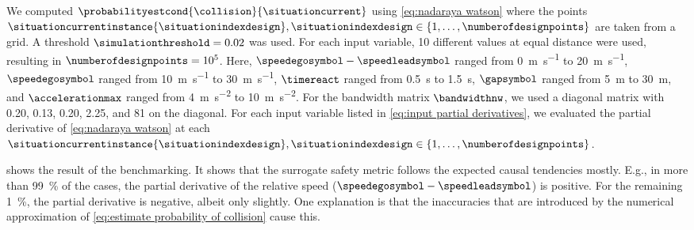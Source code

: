 We computed $\probabilityestcond{\collision}{\situationcurrent}$ using \cref{eq:nadaraya watson} where the points $\situationcurrentinstance{\situationindexdesign}, \situationindexdesign\in\{1,\ldots,\numberofdesignpoints\}$ are taken from a grid.
A threshold $\simulationthreshold=0.02$ was used.
For each input variable, 10 different values at equal distance were used, resulting in $\numberofdesignpoints=10^5$.
Here, $\speedegosymbol-\speedleadsymbol$ ranged from \SI{0}{\meter\per\second} to \SI{20}{\meter\per\second}, $\speedegosymbol$ ranged from \SI{10}{\meter\per\second} to \SI{30}{\meter\per\second}, $\timereact$ ranged from \SI{0.5}{\second} to \SI{1.5}{\second}, $\gapsymbol$ ranged from \SI{5}{\meter} to \SI{30}{\meter}, and $\accelerationmax$ ranged from \SI{4}{\meter\per\second\squared} to \SI{10}{\meter\per\second\squared}.
For the bandwidth matrix $\bandwidthnw$, we used a diagonal matrix with 0.20, 0.13, 0.20, 2.25, and 81 on the diagonal.
For each input variable listed in \cref{eq:input partial derivatives}, we evaluated the partial derivative of \cref{eq:nadaraya watson} at each $\situationcurrentinstance{\situationindexdesign}, \situationindexdesign\in\{1,\ldots,\numberofdesignpoints\}$.

 shows the result of the benchmarking. 
It shows that the surrogate safety metric follows the expected causal tendencies mostly. 
E.g., in more than \SI{99}{\%} of the cases, the partial derivative of the relative speed ($\speedegosymbol-\speedleadsymbol$) is positive.
For the remaining \SI{1}{\%}, the partial derivative is negative, albeit only slightly. 
One explanation is that the inaccuracies that are introduced by the numerical approximation of \cref{eq:estimate probability of collision} cause this.

